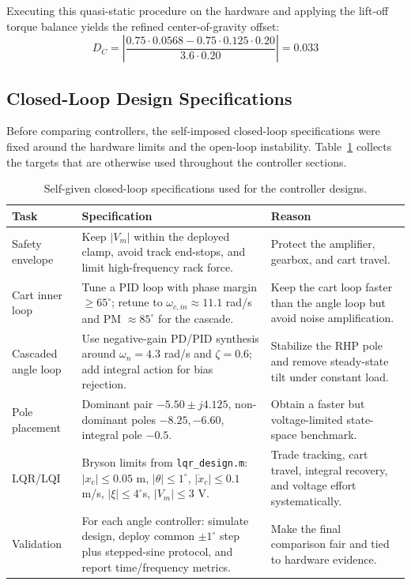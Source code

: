 \documentclass[11pt,a4paper]{article}
\begin{document}
Executing this quasi-static procedure on the hardware and applying the lift-off torque balance yields the refined center-of-gravity offset:
\begin{equation}
D_C = \left| \frac{0.75 \cdot 0.0568 - 0.75 \cdot 0.125 \cdot 0.20}{3.6 \cdot 0.20} \right| = 0.033
\end{equation}

\subsection{Closed-Loop Design Specifications}\label{sub:seesaw_cl_spec}
Before comparing controllers, the self-imposed closed-loop specifications were fixed around the hardware limits and the open-loop instability. Table~\ref{table:closed_loop_specs} collects the targets that are otherwise used throughout the controller sections.

\begin{table}[H]
\centering
\small
\begin{tabular}{|p{9em} p{17em} p{15em}|}
\hline
\rowcolor{bluePoli!40}
\textbf{Task} & \textbf{Specification} & \textbf{Reason} \T\B \\
\hline \hline
Safety envelope & Keep $|V_m|$ within the deployed clamp, avoid track end-stops, and limit high-frequency rack force. & Protect the amplifier, gearbox, and cart travel. \T\B \\
Cart inner loop & Tune a PID loop with phase margin $\ge 65^\circ$; retune to $\omega_{c,in}\approx 11.1$ rad/s and PM $\approx85^\circ$ for the cascade. & Keep the cart loop faster than the angle loop but avoid noise amplification. \T\B \\
Cascaded angle loop & Use negative-gain PD/PID synthesis around $\omega_n=4.3$ rad/s and $\zeta=0.6$; add integral action for bias rejection. & Stabilize the RHP pole and remove steady-state tilt under constant load. \T\B \\
Pole placement & Dominant pair $-5.50\pm j4.125$, non-dominant poles $-8.25,-6.60$, integral pole $-0.5$. & Obtain a faster but voltage-limited state-space benchmark. \T\B \\
LQR/LQI & Bryson limits from \texttt{lqr\_design.m}: $|x_c|\le0.05$ m, $|\theta|\le1^\circ$, $|\dot{x}_c|\le0.1$ m/s, $|\xi|\le4^\circ$s, $|V_m|\le3$ V. & Trade tracking, cart travel, integral recovery, and voltage effort systematically. \T\B \\
Validation & For each angle controller: simulate design, deploy common $\pm1^\circ$ step plus stepped-sine protocol, and report time/frequency metrics. & Make the final comparison fair and tied to hardware evidence. \B \\
\hline
\end{tabular}
\caption{Self-given closed-loop specifications used for the controller designs.}
\label{table:closed_loop_specs}
\end{table}
\end{document}
